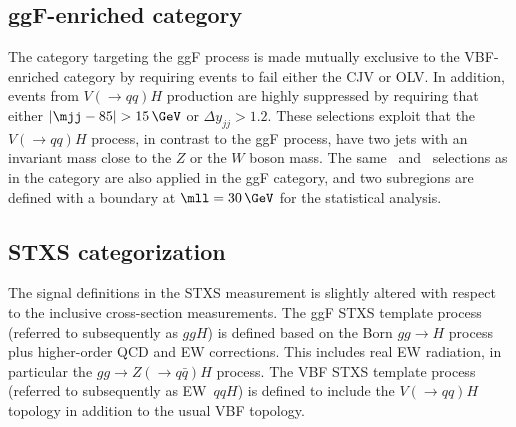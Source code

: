 \subsection{ggF-enriched \TwoJet category}
\label{subsec:ggf-two-jet-category}
The \TwoJet category targeting the ggF process is made mutually exclusive to the VBF-enriched \TwoJet category by requiring events to fail either the CJV or OLV. 
In addition, events from $V(\to qq) H$ production are highly suppressed by requiring that either $|\mjj  - 85| > 15\,\GeV$ or $\Delta y_{jj} > 1.2$. 
These selections exploit that the $V(\to qq) H$ process, in contrast to the ggF \TwoJet process, have two jets with an invariant mass close to the $Z$ or the $W$ boson mass.
The same \mll\ and \DPhill\ selections as in the \ZeroJet category are also applied in the ggF \TwoJet category, and two subregions are defined with a boundary at $\mll = 30\,\GeV$ for the statistical analysis. 

\subsection{STXS categorization}
\label{subsec:STXS-categorization}

The signal definitions in the STXS measurement is slightly altered with respect to the inclusive cross-section measurements.  
The ggF STXS template process (referred to subsequently as $ggH$) is defined based on the Born $gg \to H$ process plus higher-order QCD and EW corrections. This includes real EW radiation, in particular the $gg \to Z(\to q\bar{q})H$ process. The VBF STXS template process (referred to subsequently as EW~$qqH$) is defined to include the $V(\to qq)H$ topology in addition to the usual VBF topology.~\cite{HWWPaper}

